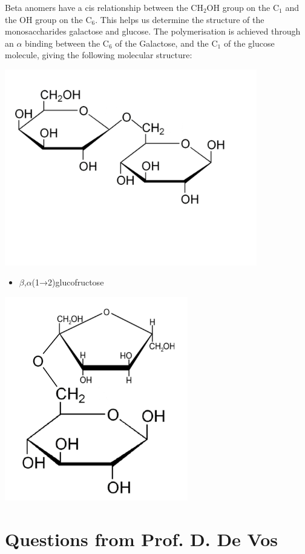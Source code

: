 \documentclass[11pt, a4paper,titlepage]{article}
\begin{document}
Beta anomers have a cis relationship between the CH$_{2}$OH group on
the C$_{1}$ and the OH group on the C$_{6}$. This helps us determine the
structure of the monosaccharides galactose and glucose. The
polymerisation is achieved through an $\alpha$ binding between the
C$_{6}$ of the Galactose, and the C$_{1}$ of the glucose molecule, giving
the following molecular structure:

\includegraphics[width=11cm]{./Figures/B-A(1-6)GalactoGlucose.pdf}

\begin{itemize}
\item $\beta$,$\alpha$(1→2)glucofructose
\end{itemize}

\includegraphics[width=8cm]{./Figures/BA(1-2)GlucoFructose2.pdf}
\section{Questions from Prof. D. De Vos}
\label{sec-3}
\end{document}
